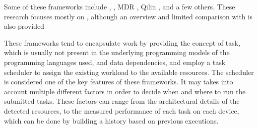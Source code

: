 \documentclass[main.tex]{subfiles}
\begin{document}
Some of these frameworks include \gama \cite{joao2012gama}, \starpu \cite{augonnet2011starpu}, MDR \cite{linderman2008merge}, Qilin \cite{luk2009qilin}, and a few others. These research focuses mostly on \starpu, although an overview and limited comparison with \gama is also provided

These frameworks tend to encapsulate work by providing the concept of task, which is usually not present in the underlying programming models of the programming languages used, and data dependencies, and employ a task scheduler to assign the existing workload to the available resources.
The scheduler is considered one of the key features of these frameworks. It may takes into account multiple different factors in order to decide when and where to run the submitted tasks. These factors can range from the architectural details of the detected resources, to the measured performance of each task on each device, which can be done by building a history based on previous executions.



\end{document}
